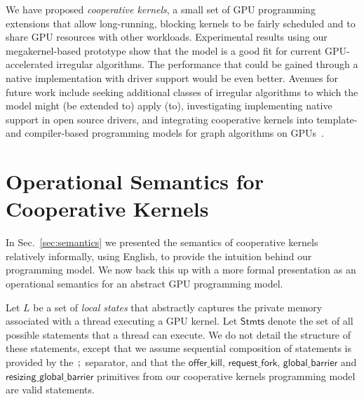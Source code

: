 \documentclass[sigconf]{acmart}
\newcommand{\mysec}{Sec.~}
\newcommand{\code}[1]{\lstset{basicstyle=\tt}\lstinline!#1!\lstset{basicstyle=\scriptsize\tt}}
\newcommand{\offerfork}{\mathsf{request\_fork}}
\newcommand{\offerkill}{\mathsf{offer\_kill}}
\newcommand{\globalbarrier}{\mathsf{global\_barrier}}
\newcommand{\resizingglobalbarrier}{\mathsf{resizing\_global\_barrier}}
\begin{document}
{We have proposed \emph{cooperative kernels}, a small set of GPU
programming extensions that allow long-running, blocking kernels to be
fairly scheduled and to share GPU resources with other workloads.
Experimental results using our megakernel-based prototype show that
the model is a good fit for current GPU-accelerated irregular
algorithms.  The performance that could be gained through a native
implementation with driver support would be even better.
%
Avenues for future work include seeking additional classes of
irregular algorithms to which the model might (be extended to) apply
(to), investigating implementing native support in open source
drivers, and integrating cooperative kernels into template- and
compiler-based programming models for graph algorithms on
GPUs~\cite{DBLP:conf/ppopp/WangDPWRO16,DBLP:conf/oopsla/PaiP16}.

\clearpage




\iffalse


\clearpage

\appendix

\section{Operational Semantics for Cooperative Kernels}\label{appendix:semantics}

\newcommand{\myss}{\mathit{ss}}
\newcommand{\Stmts}{\mathsf{Stmts}}
\newcommand{\threadstates}{\mathsf{ThreadStates}}
\newcommand{\sharedstates}{\mathsf{SharedStates}}
\newcommand{\sync}{\mathsf{sync}}

In \mysec\ref{sec:semantics} we presented the semantics of cooperative
kernels relatively informally, using English, to provide the intuition
behind our programming model.  We now back this up with a more formal
presentation as an operational semantics for an abstract GPU
programming model.

%
Let $L$ be a set of \emph{local states} that abstractly captures the
private memory associated with a thread executing a GPU kernel.  Let
$\Stmts$ denote the set of all possible statements that a
thread can execute.  We do not detail the structure of these
statements, except that we assume sequential composition of statements
is provided by the $\code{;}$ separator, and that the $\offerkill$,
$\offerfork$, $\globalbarrier$ and $\resizingglobalbarrier$ primitives
from our cooperative kernels programming model are valid statements.

}
\end{document}
